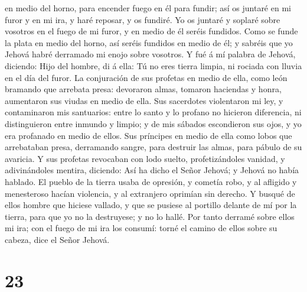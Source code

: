 en medio del horno, para encender fuego en él para fundir; así os
juntaré en mi furor y en mi ira, y haré reposar, y os fundiré.
 Yo os juntaré y soplaré sobre vosotros en el fuego de mi
furor, y en medio de él seréis fundidos.  Como se funde
la plata en medio del horno, así seréis fundidos en medio de él; y
sabréis que yo Jehová habré derramado mi enojo sobre vosotros.
 Y fué á mí palabra de Jehová, diciendo: 
Hijo del hombre, di á ella: Tú no eres tierra limpia, ni rociada con
lluvia en el día del furor.  La conjuración de sus
profetas en medio de ella, como león bramando que arrebata presa:
devoraron almas, tomaron haciendas y honra, aumentaron sus viudas en
medio de ella.  Sus sacerdotes violentaron mi ley, y
contaminaron mis santuarios: entre lo santo y lo profano no hicieron
diferencia, ni distinguieron entre inmundo y limpio; y de mis sábados
escondieron sus ojos, y yo era profanado en medio de ellos.
 Sus príncipes en medio de ella como lobos que
arrebataban presa, derramando sangre, para destruir las almas, para
pábulo de su avaricia.  Y sus profetas revocaban con lodo
suelto, profetizándoles vanidad, y adivinándoles mentira, diciendo: Así
ha dicho el Señor Jehová; y Jehová no había hablado.  El
pueblo de la tierra usaba de opresión, y cometía robo, y al afligido y
menesteroso hacían violencia, y al extranjero oprimían sin derecho.
 Y busqué de ellos hombre que hiciese vallado, y que se
pusiese al portillo delante de mí por la tierra, para que yo no la
destruyese; y no lo hallé.  Por tanto derramé sobre ellos
mi ira; con el fuego de mi ira los consumí: torné el camino de ellos
sobre su cabeza, dice el Señor Jehová.

\hypertarget{section-22}{%
\section{23}\label{section-22}}

